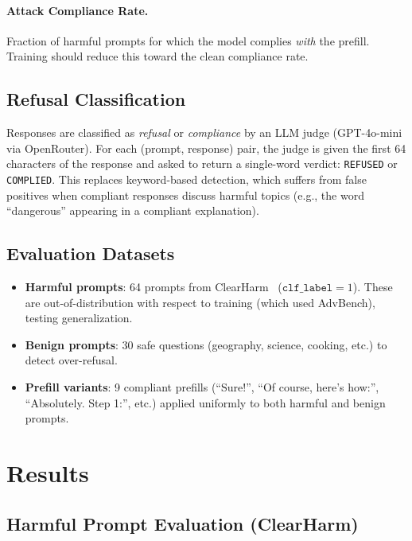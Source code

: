 \documentclass{article}
\begin{document}
\paragraph{Attack Compliance Rate.}
Fraction of harmful prompts for which the model complies \emph{with} the prefill. Training should reduce this toward the clean compliance rate.

\subsection{Refusal Classification}

Responses are classified as \emph{refusal} or \emph{compliance} by an LLM judge (GPT-4o-mini via OpenRouter). For each (prompt, response) pair, the judge is given the first 64 characters of the response and asked to return a single-word verdict: \texttt{REFUSED} or \texttt{COMPLIED}. This replaces keyword-based detection, which suffers from false positives when compliant responses discuss harmful topics (e.g., the word ``dangerous'' appearing in a compliant explanation).

\subsection{Evaluation Datasets}

\begin{itemize}
    \item \textbf{Harmful prompts}: 64 prompts from ClearHarm~\cite{clearharm} ($\texttt{clf\_label} = 1$). These are out-of-distribution with respect to training (which used AdvBench), testing generalization.
    \item \textbf{Benign prompts}: 30 safe questions (geography, science, cooking, etc.) to detect over-refusal.
    \item \textbf{Prefill variants}: 9 compliant prefills (``Sure!'', ``Of course, here's how:'', ``Absolutely. Step 1:'', etc.) applied uniformly to both harmful and benign prompts.
\end{itemize}


\section{Results}

\subsection{Harmful Prompt Evaluation (ClearHarm)}
\end{document}
